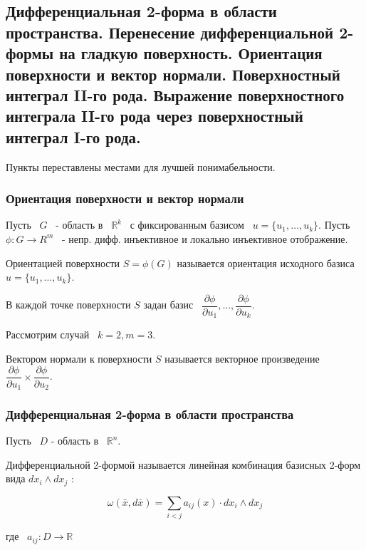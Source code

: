 \subsection{Дифференциальная 2-форма в области пространства. Перенесение дифференциальной 2-формы на гладкую поверхность. Ориентация поверхности и вектор нормали. Поверхностный интеграл II-го рода. Выражение поверхностного интеграла II-го рода через поверхностный интеграл I-го рода.}


Пункты переставлены местами для лучшей понимабельности.

\subsubsection{Ориентация поверхности и вектор нормали}

Пусть~ $G$~ - область в ~$\mathbb{R}^k$~ с фиксированным базисом ~$u = \{ u_1, \ldots, u_k \}$. Пусть ~$\phi: G \rightarrow R^m$~ - непр. дифф. инъективное и локально инъективное отображение. 

\begin{definition*} 
	Ориентацией поверхности $S = \phi(G)$ называется ориентация исходного базиса ~$u = \{ u_1, \ldots, u_k \}$.
\end{definition*}

\vspace{1em}

В каждой точке поверхности $S$ задан базис ~$\dfrac{\partial \phi}{\partial u_1}, \ldots, \dfrac{\partial \phi}{\partial u_k}$.

Рассмотрим случай ~$k = 2 , m = 3$.

\begin{definition*} 		
	Вектором нормали к поверхности $S$ называется векторное произведение $\dfrac{\partial \phi}{\partial u_1} \times \dfrac{\partial \phi}{\partial u_2}$.
\end{definition*}


\subsubsection{Дифференциальная 2-форма в области пространства}

	Пусть ~$D$ - область в ~$\mathbb{R}^n$.

	\begin{definition*} 
		Дифференциальной 2-формой называется линейная комбинация базисных 2-форм вида $dx_i \wedge dx_j$ :
		
		\[
		\omega(\bar{x}, d\bar{x}) = \sum_{i<j} a_{ij}(x) \cdot dx_i \wedge dx_j		
		\]
		
		где ~$a_{ij}: D \rightarrow \mathbb{R}$
		
	\end{definition*}
	
